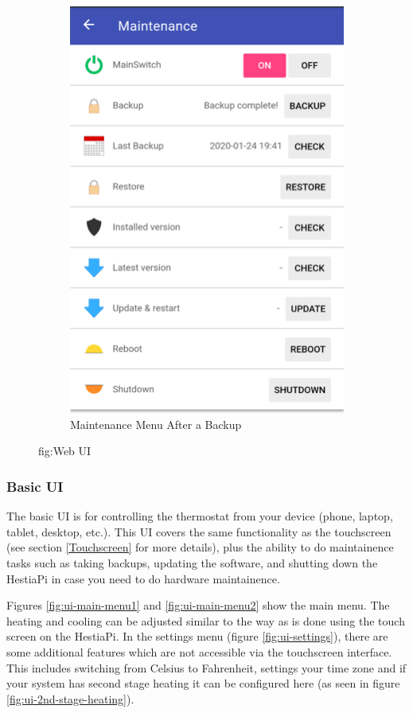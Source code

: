 \begin{figure}
\begin{subfigure}{0.33\textwidth}
  \includegraphics[width=.75\linewidth]{img/ui-maintenance2.png}
  \caption{Maintenance Menu After a Backup}
  \label{fig:ui-maintenance2}
\end{subfigure}
\caption{fig:Web UI}
\end{figure}


\subsubsection{Basic UI} \label{Basic UI}
The basic UI is for controlling the thermostat from your device (phone, laptop,
tablet, desktop, etc.).  This UI covers the same functionality as the
touchscreen (see section \ref{Touchscreen} for more details), plus the ability
to do maintainence tasks such as taking backups, updating the software, and
shutting down the HestiaPi in case you need to do hardware maintainence.

Figures \ref{fig:ui-main-menu1} and \ref{fig:ui-main-menu2} show the main menu.
The heating and cooling can be adjusted similar to the way as is done using the
touch screen on the HestiaPi.  In the settings menu (figure
\ref{fig:ui-settings}), there are some additional features which are not
accessible via the touchscreen interface.  This includes switching from Celsius
to Fahrenheit, settings your time zone and if your system has second stage
heating it can be configured here (as seen in figure
\ref{fig:ui-2nd-stage-heating}).

